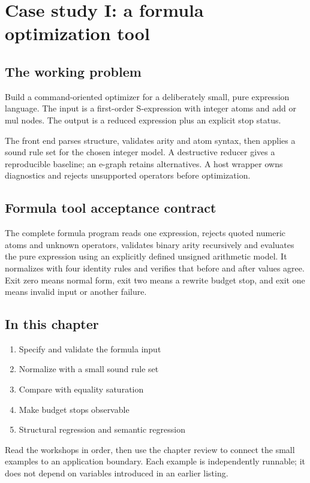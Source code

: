 \chapter{Case study I: a formula optimization tool}\label{ch:23}
\section*{The working problem}
Build a command-oriented optimizer for a deliberately small, pure expression language. The input is a first-order S-expression with integer atoms and add or mul nodes. The output is a reduced expression plus an explicit stop status.

The front end parses structure, validates arity and atom syntax, then applies a sound rule set for the chosen integer model. A destructive reducer gives a reproducible baseline; an e-graph retains alternatives. A host wrapper owns diagnostics and rejects unsupported operators before optimization.

\section*{Formula tool acceptance contract}
The complete formula program reads one expression, rejects quoted numeric atoms and unknown operators, validates binary arity recursively and evaluates the pure expression using an explicitly defined unsigned arithmetic model. It normalizes with four identity rules and verifies that before and after values agree. Exit zero means normal form, exit two means a rewrite budget stop, and exit one means invalid input or another failure.

\section*{In this chapter}
\begin{enumerate}
\item Specify and validate the formula input
\item Normalize with a small sound rule set
\item Compare with equality saturation
\item Make budget stops observable
\item Structural regression and semantic regression
\end{enumerate}
Read the workshops in order, then use the chapter review to connect the small examples to an application boundary. Each example is independently runnable; it does not depend on variables introduced in an earlier listing.

